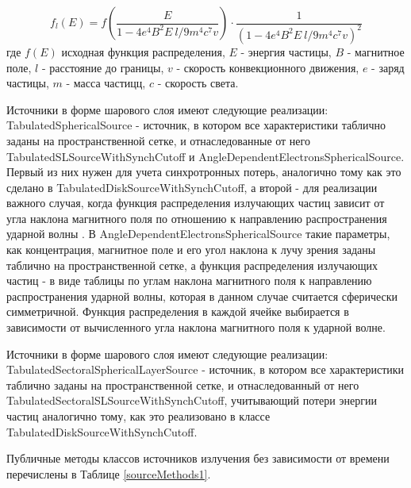 \begin{equation}
	f_l(E)=f\left(\frac{E}{1-4e^4 B^2 E~l/9m^4 c^7 v}\right)\cdot\frac{1}{\left(1-4e^4 B^2 E~l/9m^4 c^7 v\right)^2}
\end{equation}
где $f(E)$ исходная функция распределения, $E$ - энергия частицы, $B$ - магнитное поле, $l$ - расстояние до границы, $v$ - скорость конвекционного движения, $e$ - заряд частицы, $m$ - масса частицц, $c$ - скорость света.

Источники в форме шарового слоя имеют следующие реализации: TabulatedSphericalSource - источник, в котором все характеристики таблично заданы на пространственной сетке, и отнаследованные от него  TabulatedSLSourceWithSynchCutoff и AngleDependentElectronsSphericalSource. Первый из них нужен для учета синхротронных потерь, аналогично тому как это сделано в TabulatedDiskSourceWithSynchCutoff, а второй - для реализации важного случая, когда функция распределения излучающих частиц зависит от угла наклона магнитного поля по отношению к направлению распространения ударной волны \cite{SironiSpitkovsky2009pair, GuoSironi2014_1,Crumley2019, Romansky2018, еще}. В AngleDependentElectronsSphericalSource такие параметры, как концентрация, магнитное поле и его угол наклона к лучу зрения заданы таблично на пространственной сетке, а функция распределения излучающих частиц - в виде таблицы по углам наклона магнитного поля к направлению распространения ударной волны, которая в данном случае считается сферически симметричной. Функция распределения в каждой ячейке выбирается в зависимости от вычисленного угла наклона магнитного поля к ударной волне.

Источники в форме шарового слоя имеют следующие реализации: TabulatedSectoralSphericalLayerSource - источник, в котором все характеристики таблично заданы на пространственной сетке, и отнаследованный от него TabulatedSectoralSLSourceWithSynchCutoff, учитывающий потери энергии частиц аналогично тому, как это реализовано в классе TabulatedDiskSourceWithSynchCutoff.

Публичные методы классов источников излучения без зависимости от времени перечислены в Таблице \ref{sourceMethods1}.

